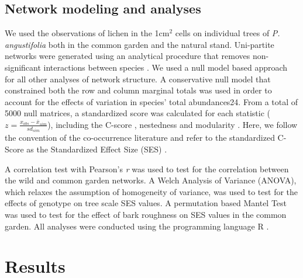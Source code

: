 \documentclass[fleqn,10pt]{wlscirep}
\begin{document}
\subsection*{Network modeling and analyses}

We used the observations of lichen in the 1cm$^2$ cells on individual
trees of \textit{P. angustifolia} both in the common garden and the
natural stand. Uni-partite networks were generated using an analytical
procedure that removes non-significant interactions between species
\cite{Araujo2011}. We used a null model based approach for all other
analyses of network structure. A conservative null model that
constrained both the row and column marginal totals was used in order
to account for the effects of variation in species’ total
abundances24. From a total of 5000 null matrices, a standardized score
was calculated for each statistic ($z = \frac{x_{obs} -
  \bar{x}_{sim}}{sd_{sim}}$), including the C-score \cite{Stone1990a},
nestedness \cite{Atmar1993} and modularity \cite{Newman2006}. Here, we
follow the convention of the co-occurrence literature and refer to the
standardized C-Score as the Standardized Effect Size (SES)
\cite{Gotelli2001}.

A correlation test with Pearson’s \textit{r} was used to test for the
correlation between the wild and common garden networks. A Welch
Analysis of Variance (ANOVA), which relaxes the assumption of
homogeneity of variance, was used to test for the effects of genotype
on tree scale SES values. A permutation based Mantel Test was used to
test for the effect of bark roughness on SES values in the common
garden. All analyses were conducted using the programming language R
\cite{RCoreTeam2017}.



\section*{Results}

\end{document}
